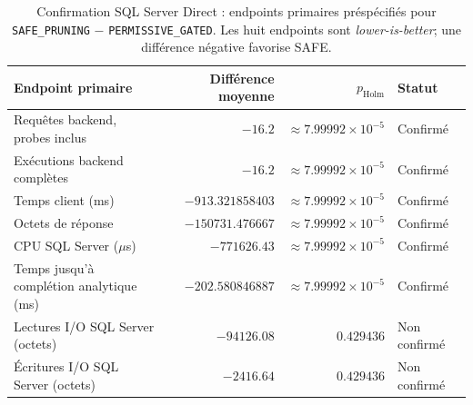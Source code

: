 \begin{table}[!t]
\centering
\caption{Confirmation SQL Server Direct : endpoints primaires préspécifiés pour \texttt{SAFE\_PRUNING} $-$ \texttt{PERMISSIVE\_GATED}. Les huit endpoints sont \emph{lower-is-better}; une différence négative favorise SAFE.}
\label{tab:r3d-primary-endpoints}
\scriptsize
\setlength{\tabcolsep}{3.2pt}
\renewcommand{\arraystretch}{1.08}
\begin{tabularx}{\textwidth}{@{}X r r l@{}}
\toprule
Endpoint primaire & Différence moyenne & $p_{\mathrm{Holm}}$ & Statut \\
\midrule
Requêtes backend, probes inclus & $-16.2$ & $\approx 7.99992\times10^{-5}$ & Confirmé \\
Exécutions backend complètes & $-16.2$ & $\approx 7.99992\times10^{-5}$ & Confirmé \\
Temps client (ms) & $-913.321858403$ & $\approx 7.99992\times10^{-5}$ & Confirmé \\
Octets de réponse & $-150731.476667$ & $\approx 7.99992\times10^{-5}$ & Confirmé \\
CPU SQL Server ($\mu$s) & $-771626.43$ & $\approx 7.99992\times10^{-5}$ & Confirmé \\
Temps jusqu'à complétion analytique (ms) & $-202.580846887$ & $\approx 7.99992\times10^{-5}$ & Confirmé \\
Lectures I/O SQL Server (octets) & $-94126.08$ & $0.429436$ & Non confirmé \\
Écritures I/O SQL Server (octets) & $-2416.64$ & $0.429436$ & Non confirmé \\
\bottomrule
\end{tabularx}
\end{table}
